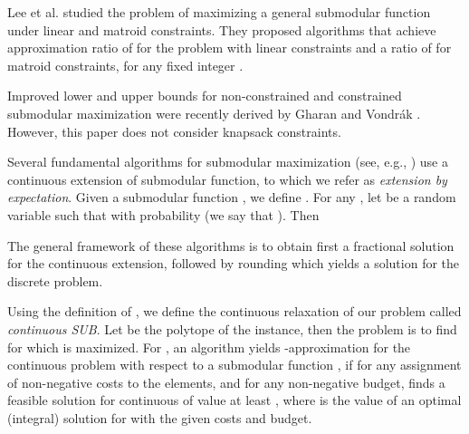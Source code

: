 \documentclass[11pt]{article}
\newcommand{\comment}[1]{}
\newcommand{\SUB}{\mbox{SUB}}
\begin{document}
{Lee et al. \cite{LMNS09} studied the problem of
maximizing a general submodular function under linear and matroid
constraints. They proposed algorithms that achieve approximation
ratio of  for  the problem with  linear constraints
and a ratio of  for  matroid constraints,
for any fixed integer .

Improved lower and upper bounds for non-constrained and constrained submodular maximization
were recently derived by Gharan and Vondr\'{a}k
\cite{SV10}. However, this paper does not consider knapsack constraints.


\comment{ Submodular maximization problem where the focus of many
works. The best approximation ratio for maximizing non-monotone
submodular function without any constraints is  general
functions, and  for symmetric function, both algorithm
are due to \cite{FMV07}. { {\bf write a survey of results for
constraints maximization}. For monotone functions mention the
classic greedy algorithm for cardinality and knapsack constraint.
Later matroid constraints, and afterwards our results. For
non-monotone mention Sviridenko. } }

Several fundamental algorithms for submodular maximization
(see, e.g., \cite{as04,ccpv07,Vo08,LMNS09})
use a continuous extension of submodular function, to which we
refer as \emph{extension by expectation}. Given a submodular
function , we define .
For any , let   be a random
variable such that  with probability  (we say that
). Then

The general framework of these algorithms is to obtain first a
fractional solution for the continuous extension, followed by
rounding which yields a solution for the discrete problem.

Using the definition of , we define the continuous relaxation of our problem called
{\em continuous \SUB}. Let  be the polytope of the instance, then the problem
is to find  for which  is
maximized. For , an algorithm  yields -approximation
 for the continuous problem with respect to a submodular
function , if for any assignment of non-negative costs to the elements, and for any non-negative budget,  finds a feasible solution for
continuous  of value at least , where  is the value of an optimal
(integral) solution for  with the given costs and budget.


}
\end{document}
